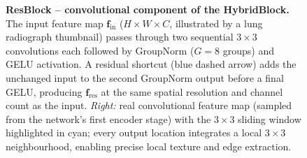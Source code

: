 \begin{figure}[htbp]
{\begin{tikzpicture}
\end{tikzpicture}%
}
\caption[ResBlock convolutional component architecture]{%
  \textbf{ResBlock -- convolutional component of the HybridBlock.}
  The input feature map $\mathbf{f}_{\mathrm{in}}$ ($H{\times}W{\times}C$, illustrated
  by a lung radiograph thumbnail) passes through two sequential $3{\times}3$
  convolutions each followed by GroupNorm ($G{=}8$ groups) and GELU activation.
  A residual shortcut (blue dashed arrow) adds the unchanged input to the second
  GroupNorm output before a final GELU, producing $\mathbf{f}_{\mathrm{res}}$ at the
  same spatial resolution and channel count as the input.
  \textit{Right:} real convolutional feature map (sampled from the network's first
  encoder stage) with the $3{\times}3$ sliding window highlighted in cyan; every
  output location integrates a local $3{\times}3$ neighbourhood, enabling
  precise local texture and edge extraction.}
\label{fig:arch:resblock}
\end{figure}
